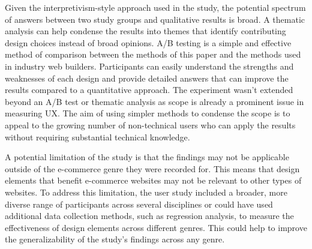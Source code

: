 \documentclass[article]{IEEEtran}
\begin{document}
        Given the interpretivism-style approach used in the study, the potential spectrum of answers between two study groups and qualitative results is broad. A thematic analysis can help condense the results into themes that identify contributing design choices instead of broad opinions. A/B testing is a simple and effective method of comparison between the methods of this paper and the methods used in industry web builders. Participants can easily understand the strengths and weaknesses of each design and provide detailed answers that can improve the results compared to a quantitative approach. The experiment wasn't extended beyond an A/B test or thematic analysis as scope is already a prominent issue in measuring UX. The aim of using simpler methods to condense the scope is to appeal to the growing number of non-technical users who can apply the results without requiring substantial technical knowledge.

        A potential limitation of the study is that the findings may not be applicable outside of the e-commerce genre they were recorded for. This means that design elements that benefit e-commerce websites may not be relevant to other types of websites. To address this limitation, the user study included a broader, more diverse range of participants across several disciplines or could have used additional data collection methods, such as regression analysis, to measure the effectiveness of design elements across different genres. This could help to improve the generalizability of the study's findings across any genre.
        
\end{document}
